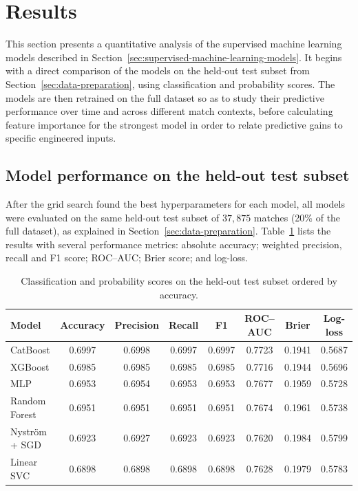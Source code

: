 \pagebreak


\section{Results}
\label{sec:results}

This section presents a quantitative analysis of the supervised machine learning models described in
Section~\ref{sec:supervised-machine-learning-models}. It begins with a direct comparison of the models on the
held-out test subset from Section~\ref{sec:data-preparation}, using classification and probability
scores. The models are then retrained on the full dataset so as to study their predictive performance
over time and across different match contexts, before calculating feature importance for the
strongest model in order to relate predictive gains to specific engineered inputs.

\subsection{Model performance on the held-out test subset}

After the grid search found the best hyperparameters for each model, all models were evaluated on
the same held-out test subset of $37{,}875$ matches (20\% of the full dataset), as explained in
Section~\ref{sec:data-preparation}. Table~\ref{tab:model-performance-test} lists the results with
several performance metrics: absolute accuracy; weighted precision, recall and F1 score; ROC--AUC;
Brier score; and log-loss.

\begin{table}[ht!]
  \centering
  \small
  \caption{Classification and probability scores on the held-out test subset ordered by accuracy.}
  \vspace{1em}
  \begin{tabular}{lccccccc}
    \toprule
    \textbf{Model} & \textbf{Accuracy} & \textbf{Precision} & \textbf{Recall} & \textbf{F1} & \textbf{ROC--AUC} & \textbf{Brier} & \textbf{Log-loss} \\
    \midrule
    CatBoost      & 0.6997 & 0.6998 & 0.6997 & 0.6997 & 0.7723 & 0.1941 & 0.5687 \\
    XGBoost       & 0.6985 & 0.6985 & 0.6985 & 0.6985 & 0.7716 & 0.1944 & 0.5696 \\
    MLP           & 0.6953 & 0.6954 & 0.6953 & 0.6953 & 0.7677 & 0.1959 & 0.5728 \\
    Random Forest & 0.6951 & 0.6951 & 0.6951 & 0.6951 & 0.7674 & 0.1961 & 0.5738 \\
    Nyström + SGD & 0.6923 & 0.6927 & 0.6923 & 0.6923 & 0.7620 & 0.1984 & 0.5799 \\
    Linear SVC    & 0.6898 & 0.6898 & 0.6898 & 0.6898 & 0.7628 & 0.1979 & 0.5783 \\
    \bottomrule
  \end{tabular}
  \label{tab:model-performance-test}
\end{table}

